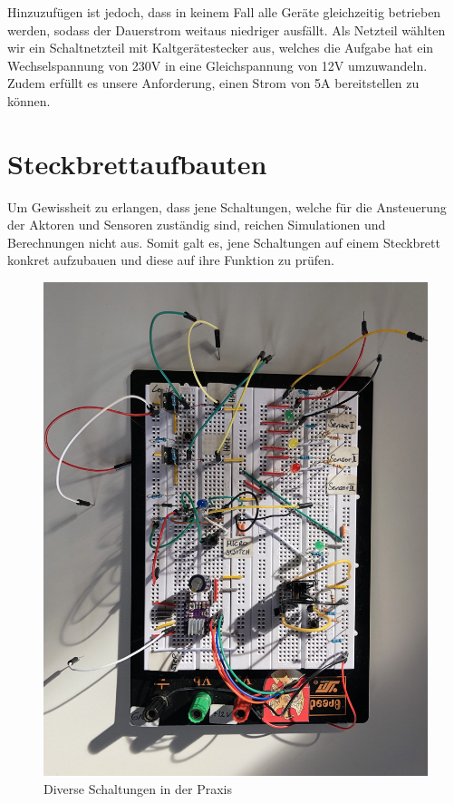 Hinzuzufügen ist jedoch, dass in keinem Fall alle Geräte gleichzeitig betrieben werden, sodass der Dauerstrom weitaus niedriger ausfällt.
Als Netzteil wählten wir ein Schaltnetzteil mit Kaltgerätestecker aus, welches die Aufgabe hat ein Wechselspannung von 230V in eine Gleichspannung von 12V umzuwandeln.
Zudem erfüllt es unsere Anforderung, einen Strom von 5A bereitstellen zu können.

\newpage

\section{Steckbrettaufbauten}

Um Gewissheit zu erlangen, dass jene Schaltungen, welche für die Ansteuerung der Aktoren und Sensoren zuständig sind, reichen Simulationen und Berechnungen nicht aus.
Somit galt es, jene Schaltungen auf einem Steckbrett konkret aufzubauen und diese auf ihre Funktion zu prüfen. \\

\begin{figure}[hb]
    \centering
    \includegraphics[scale=0.08]{fig/elektro/Steckbrett}
    \caption{Diverse Schaltungen in der Praxis}
\end{figure}

